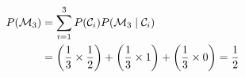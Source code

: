 \begin{align}
    P( \mathcal{M}_3 ) &= \sum_{i=1}^3 P( \mathcal{C}_i ) P( \mathcal{M}_3 \mid \mathcal{C}_{i} ) \notag \\
       &= \left(\frac{1}{3} \times \frac{1}{2}\right) + \left(\frac{1}{3} \times 1\right) + \left(\frac{1}{3} \times 0\right) = \frac{1}{2}
\end{align}


